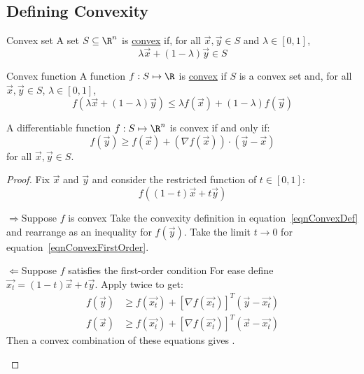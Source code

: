 \documentclass[../Main.tex]{subfiles}
\begin{document}
\subsection{Defining Convexity}
\begin{definition}{Convex set}
    A set $S \subseteq \R^n$ is \underline{convex} if, for all $\vec{x}, \vec{y} \in S$ and $\lambda \in [0,1]$,
    \begin{equation*}
        \lambda \vec{x} + (1-\lambda) \vec{y} \in S
    \end{equation*}
\end{definition}
\begin{definition}{Convex function}
    A function $f : S \mapsto \R$ is \underline{convex} if $S$ is a convex set and, for all $\vec{x}, \vec{y} \in S$, $\lambda \in [0, 1]$,
    \begin{equation}
        f(\lambda \vec{x} + (1-\lambda) \vec{y}) \leq \lambda f(\vec{x}) + (1-\lambda) f(\vec{y})
        \label{eqnConvexDef}
    \end{equation}
\end{definition}
\begin{theorem}
    A differentiable function $f : S \mapsto \R^n$ is convex if and only if:
    \begin{equation}
        f(\vec{y}) \geq f(\vec{x}) + \left(\nabla f(\vec{x})\right) \cdot (\vec{y} - \vec{x})
        \label{eqnConvexFirstOrder}
    \end{equation}
    for all $\vec{x}, \vec{y} \in S$.
    \label{thmConvexFirstOrder}
\end{theorem}
\begin{proof}
    Fix $\vec{x}$ and $\vec{y}$ and consider the restricted function of $t \in [0, 1]$:
    \begin{equation*}
        f((1-t)\vec{x} + t\vec{y})
    \end{equation*}
    \begin{proofdirection}{$\Rightarrow$}{Suppose $f$ is convex}
        Take the convexity definition in equation~\ref{eqnConvexDef} and rearrange as an inequality for $f(\vec{y})$. Take the limit $t \to 0$ for equation~\ref{eqnConvexFirstOrder}.
    \end{proofdirection}
    \begin{proofdirection}{$\Leftarrow$}{Suppose $f$ satisfies the first-order condition}
        For ease define $\vec{x_t} = (1-t)\vec{x} + t\vec{y}$. Apply  twice to get:
        \begin{align*}
            f(\vec{y}) &\geq f(\vec{x_t}) + \left[\nabla f(\vec{x_t})\right]^T (\vec{y} - \vec{x_t}) \\
            f(\vec{x}) &\geq f(\vec{x_t}) + \left[\nabla f(\vec{x_t})\right]^T (\vec{x} - \vec{x_t})
        \end{align*}
        Then a convex combination of these equations gives .
    \end{proofdirection}
\end{proof}
\end{document}
